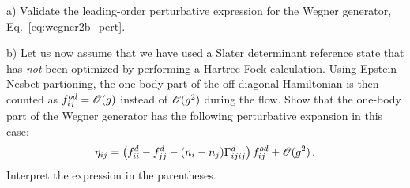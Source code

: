 {\begin{prob}\label{problem:wegner_pert}
  \item[a)]
    Validate the leading-order perturbative expression for the Wegner generator, Eq.~\eqref{eq:wegner2b_pert}.
  \item[b)]
    Let us now assume that we have used a Slater determinant reference state that 
    has \emph{not} been optimized by performing a Hartree-Fock calculation. Using
    Epstein-Nesbet partioning, the one-body part of the off-diagonal Hamiltonian
    is then counted as $f^{od}_{ij}=\mathcal{O}(g)$ instead of $\mathcal{O}(g^2)$ during the flow.
    Show that the one-body part of the Wegner generator has the following perturbative
    expansion in this case: 
    \begin{equation}\label{eq:wegner1b_pert}
      \eta_{ij} = \left(f^d_{ii} - f^d_{jj} - (n_i-n_j)\Gamma^d_{ijij}\right)f^{od}_{ij} + \OC(g^2)\,.
    \end{equation}
    Interpret the expression in the parentheses.
\end{prob}

\begin{prob}
\end{prob}

\begin{prob}
\end{prob}

}
